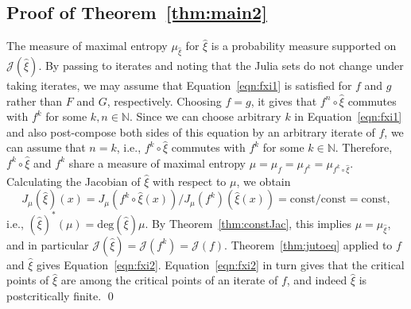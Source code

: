 \documentclass[12pt]{amsart}
\newcommand{\N}{\mathbb{N}}
\newcommand{\J}{\mathcal{J}}
\begin{document}
\subsection{Proof of Theorem~\ref{thm:main2}}
The measure of maximal entropy  $\mu_{\widehat\xi}$ for $\widehat\xi$ is a probability measure supported on $\J(\widehat\xi)$. By passing to iterates and noting that the Julia sets do not change under taking iterates, we may assume that Equation~\eqref{eqn:fxi1} is satisfied for $f$ and $g$ rather than $F$ and $G$, respectively. Choosing $f=g$, it gives that $f^n\circ \widehat\xi$ commutes with $f^k$ for some $k,n\in\N$. 
Since we can choose arbitrary $k$ in Equation~\eqref{eqn:fxi1} and also post-compose both sides of this equation by an arbitrary iterate of $f$, we can assume that $n=k$, i.e., $f^k\circ \widehat\xi$ commutes with $f^k$ for some $k\in\N$. 
Therefore, $f^k\circ \widehat\xi$ and $f^k$
share a measure of maximal entropy  $\mu=\mu_f=\mu_{f^k}=\mu_{f^k\circ \widehat{\xi}}$. Calculating the Jacobian of $\widehat{\xi}$ with 
respect to $\mu$, we obtain 
$$J_\mu(\widehat{\xi})(x)=J_\mu(f^k\circ \widehat{\xi}(x))/J_\mu(f^k)(\widehat{\xi}(x))=\mathrm{const}/\mathrm{const}=\mathrm{const},$$ i.e., $(\widehat{\xi})^*(\mu)=\mathrm{deg}(\widehat\xi)\mu$. 
By Theorem~\ref{thm:constJac}, this implies $\mu=\mu_{\widehat{\xi}}$, and in particular $\J(\widehat{\xi})=\J(f^k)=\J(f)$. 
Theorem~\ref{thm:jutoeq} applied to $f$ and $\widehat\xi$ gives Equation~\eqref{eqn:fxi2}.  Equation~\eqref{eqn:fxi2} in turn gives that the critical points of $\widehat\xi$ are among the critical points of an iterate of $f$, and indeed $\widehat\xi$ is postcritically finite.
\qed

\bigskip
\end{document}
